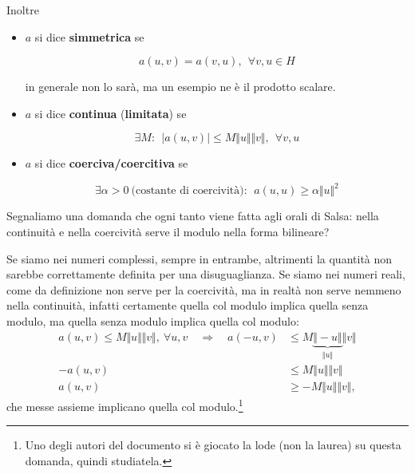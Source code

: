 \documentclass[10pt,a4paper,twoside,openright]{book}
\begin{document}
\begin{definition}
    Inoltre
    \begin{itemize}
        \item $a$ si dice \textbf{simmetrica} se

              \begin{equation*}
                  a(u,v) =a(v,u),\ \ \forall v,u\in H
              \end{equation*}

              in generale non lo sarà, ma un esempio ne è il prodotto scalare.
        \item $a$ si dice \textbf{continua} (\textbf{limitata}) se

              \begin{equation*}
                  \exists M:\ \ | a(u,v)| \leqslant M\Vert u\Vert \Vert v\Vert,\ \ \forall v,u
              \end{equation*}
        \item $a$ si dice \textbf{coerciva/coercitiva} se

              \begin{equation*}
                  \exists \alpha  >0\ \text{(costante di coercività)} :\ \ a(u,u) \geqslant \alpha \Vert u\Vert ^{2}
              \end{equation*}
    \end{itemize}
\end{definition}
Segnaliamo una domanda che ogni tanto viene fatta agli orali di Salsa: nella continuità e nella coercività serve il modulo nella forma bilineare?

Se siamo nei numeri complessi, sempre in entrambe, altrimenti la quantità non sarebbe correttamente definita per una disuguaglianza.
Se siamo nei numeri reali, come da definizione non serve per la coercività, ma in realtà non serve nemmeno nella continuità, infatti certamente quella col modulo implica quella senza modulo, ma quella senza modulo implica quella col modulo:
\begin{align*}
    a(u,v)\le M \Vert u \Vert \Vert v \Vert,\ \forall u,v \quad \Rightarrow \quad a(-u,v) & \le  M \underbrace{\Vert -u \Vert}_{\Vert u \Vert} \Vert v \Vert \\
    -a(u,v)                                                                               & \le  M \Vert u \Vert \Vert v \Vert                               \\
    a(u,v)                                                                                & \ge -M \Vert u \Vert \Vert v \Vert,
\end{align*}
che messe assieme implicano quella col modulo.\footnote{Uno degli autori del documento si è giocato la lode (non la laurea) su questa domanda, quindi studiatela.}
\end{document}
